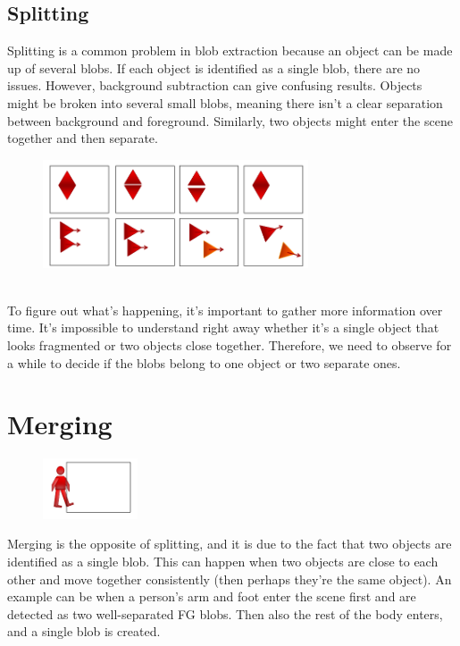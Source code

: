 \subsection{Splitting}
Splitting is a common problem in blob extraction because an object can be made up of several blobs. 
If each object is identified as a single blob, there are no issues. 
However, background subtraction can give confusing results. 
Objects might be broken into several small blobs, meaning there isn't a clear separation between background and foreground. 
Similarly, two objects might enter the scene together and then separate.
\begin{figure}[h]
    \centering
    \includegraphics[width=0.7\textwidth]{Figures/Splitting.png}
\end{figure}\\
To figure out what's happening, it's important to gather more information over time. 
It's impossible to understand right away whether it's a single object that looks fragmented or two objects close together. 
Therefore, we need to observe for a while to decide if the blobs belong to one object or two separate ones.
\section{Merging}
\begin{figure}
    \centering
    \includegraphics[width=0.25\textwidth]{Figures/Merging.png}
\end{figure}
Merging is the opposite of splitting, and it is due to the fact that two objects are identified as a single blob. This can happen when two objects are close to each other and move together consistently (then perhaps they're the same object).
An example can be when a person’s arm and foot enter the scene first and are detected as two well-separated FG blobs. 
Then also the rest of the body enters, and a single blob is created. 

